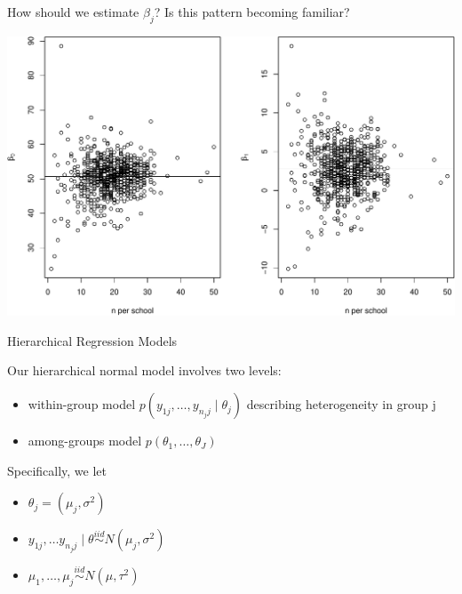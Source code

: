 \documentclass[ignorenonframetext,]{beamer}
\providecommand{\tightlist}{%
  \setlength{\itemsep}{0pt}\setlength{\parskip}{0pt}}
\begin{document}
\begin{frame}{}

How should we estimate \(\beta_j\)? Is this pattern becoming familiar?

\includegraphics{anova_06_deck_files/figure-beamer/betasbyn-1.pdf}

\end{frame}

\begin{frame}{Hierarchical Regression Models}

Our hierarchical normal model involves two levels:

\begin{itemize}
\tightlist
\item
  within-group model \(p(y_{1j},\ldots,y_{n_jj} \mid \theta_j)\)
  describing heterogeneity in group j
\item
  among-groups model \(p(\theta_1,\ldots,\theta_J)\)
\end{itemize}

Specifically, we let

\begin{itemize}
\tightlist
\item
  \(\theta_j=(\mu_j, \sigma^2)\)
\item
  \(y_{1j}, \ldots y_{n_jj} \mid \theta \overset{iid}{\sim}N\left(\mu_j, \sigma^2\right)\)
\item
  \(\mu_1,\ldots,\mu_j \overset{iid}{\sim}N\left(\mu, \tau^2\right)\)
\end{itemize}

\end{frame}
\end{document}
